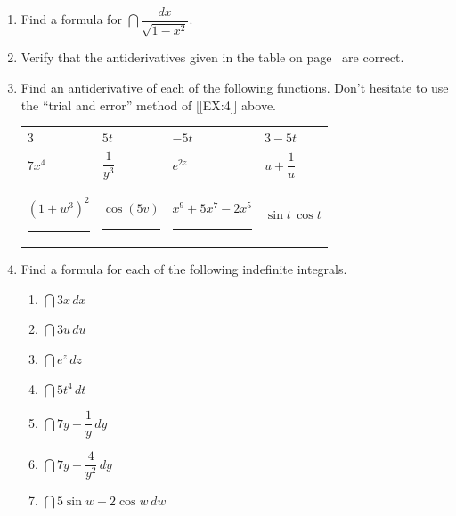 \begin{enumerate}
  \begin{enumerate}
  \item Use part (a), and the derivative of $\arcsin{x}$, to determine
the derivative of $\arccos{x}$.  Does this result agree with what you
got in the last exercise?


\end{enumerate}
\item Find a formula for $\dint \dfrac{dx}{\sqrt{1 - x^2}}$.



\item Verify that the antiderivatives given in the table on
page~\pageref{table} are correct.


\item Find an antiderivative of each of the following functions.  Don't
hesitate to use the ``trial and error'' method of [[EX:4]] above.
\begin{center}


\begin{tabular}{llll}
	$3$ 	& $5t$ 	& $-5t$ 	& $3 - 5t$ \\ [6pt]
	$7x^4$	& $\dfrac{1}{y^3}$	& 
		$e^{\displaystyle 2z}$ & 
		$u + \dfrac{1}{u}$ \\ [12pt]
	$(1 + w^3)^2$ \rule{15pt}{0pt} & 
		$\cos(5v)$ \rule{15pt}{0pt} & 
		$x^9 + 5x^7 - 2x^5$ \rule{15pt}{0pt} & 
		$\sin{t} \, \cos{t}$ 
	\end{tabular}
\end{center}


\item Find a formula for each of the following indefinite integrals.







  \begin{enumerate}
  \item $\dint 3x \, dx$


  \item $\dint 3u \, du$


  \item $\dint e^z \, dz$


  \item $\dint 5t^4 \, dt$


  \item $\dint 7y + \dfrac{1}{y} \, dy$


  \item $\dint 7y - \dfrac{4}{y^2} \, dy$
		

  \item $\dint 5\sin{w} - 2\cos{w} \, dw$
	


\end{enumerate}
\end{enumerate}
